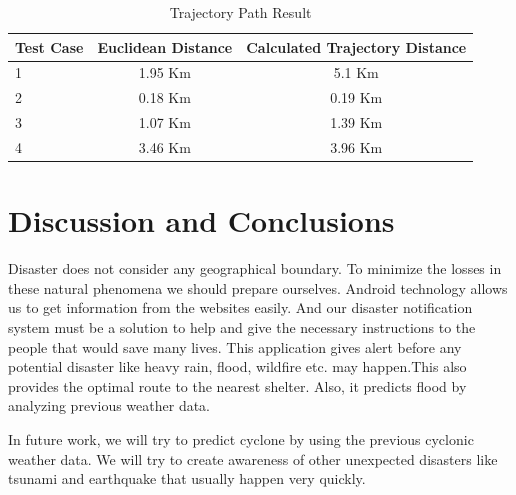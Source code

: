 \documentclass[conference]{IEEEtran}
\begin{document}
\begin{table}[htp]
\centering
\caption{Trajectory Path Result}

\begin{tabular}{|l|c|c|}
\hline
Test Case & Euclidean Distance & Calculated Trajectory Distance \\
\hline
1 & 1.95 Km & 5.1 Km \\
\hline
2 & 0.18 Km & 0.19 Km  \\
\hline

3 & 1.07 Km & 1.39 Km \\
\hline

4 & 3.46 Km & 3.96 Km\\
\hline

\end{tabular}
\label{tab:resultclass}
\end{table}



\section{Discussion and Conclusions}
\label{conclusion}

Disaster does not consider any geographical boundary. To minimize the losses in these natural phenomena we should prepare ourselves. Android technology allows us to get information from the websites easily. And our disaster notification system must be a solution to help and give the necessary instructions to the people that would save many lives. This application gives alert before any potential disaster like heavy rain, flood, wildfire etc. may happen.This also provides the optimal route to the nearest shelter. Also, it predicts flood by analyzing previous weather data.

In future work, we will try to predict cyclone by using the previous cyclonic weather data. We will try to create awareness of other unexpected disasters like tsunami and earthquake that usually happen very quickly.
 





%
%

%

\balance

\end{document}
